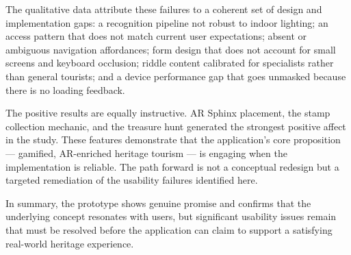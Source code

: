 The qualitative data attribute these failures to a coherent set of design and
implementation gaps: a recognition pipeline not robust to indoor lighting; an access
pattern that does not match current user expectations; absent or ambiguous navigation
affordances; form design that does not account for small screens and keyboard occlusion;
riddle content calibrated for specialists rather than general tourists; and a device
performance gap that goes unmasked because there is no loading feedback.

The positive results are equally instructive. AR Sphinx placement, the stamp collection
mechanic, and the treasure hunt generated the strongest positive affect in the study.
These features demonstrate that the application's core proposition — gamified, AR-enriched
heritage tourism — is engaging when the implementation is reliable. The path forward is
not a conceptual redesign but a targeted remediation of the usability failures
identified here.

In summary, the prototype shows genuine promise and confirms that the underlying
concept resonates with users, but significant usability issues remain that must be
resolved before the application can claim to support a satisfying real-world heritage
experience.
